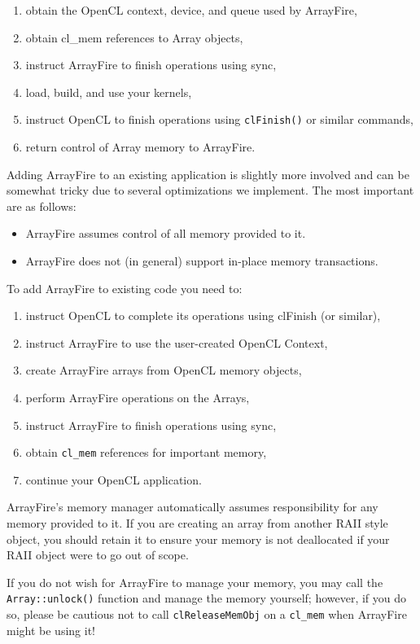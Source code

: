 \begin{enumerate}
\item obtain the OpenCL context, device, and queue used by ArrayFire,
\item obtain cl_mem references to Array objects,
\item instruct ArrayFire to finish operations using sync,
\item load, build, and use your kernels,
\item instruct OpenCL to finish operations using \texttt{clFinish()} or similar commands,
\item return control of Array memory to ArrayFire.
\end{enumerate}

Adding ArrayFire to an existing application is slightly more involved and can be somewhat tricky due to several optimizations we implement. The most important are as follows:

\begin{itemize}
\item ArrayFire assumes control of all memory provided to it.
\item ArrayFire does not (in general) support in-place memory transactions.
\end{itemize}

To add ArrayFire to existing code you need to:

\begin{enumerate}
\item instruct OpenCL to complete its operations using clFinish (or similar),
\item instruct ArrayFire to use the user-created OpenCL Context,
\item create ArrayFire arrays from OpenCL memory objects,
\item perform ArrayFire operations on the Arrays,
\item instruct ArrayFire to finish operations using sync,
\item obtain \texttt{cl_mem} references for important memory,
\item continue your OpenCL application.
\end{enumerate}
	
ArrayFire's memory manager automatically assumes responsibility for any memory provided to it. If you are creating an array from another RAII style object, you should retain it to ensure your memory is not deallocated if your RAII object were to go out of scope.

If you do not wish for ArrayFire to manage your memory, you may call the \texttt{Array::unlock()} function and manage the memory yourself; however, if you do so, please be cautious not to call \texttt{clReleaseMemObj} on a \texttt{cl_mem} when ArrayFire might be using it!

